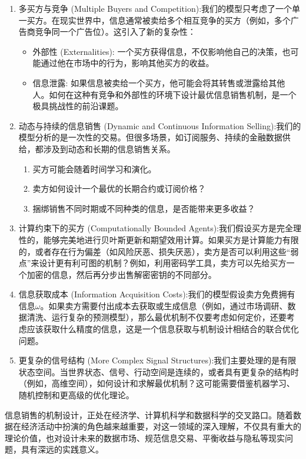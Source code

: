 \begin{enumerate}
    \item 多买方与竞争 (Multiple Buyers and Competition):我们的模型只考虑了一个单一买方。在现实世界中，信息通常被卖给多个相互竞争的买方（例如，多个广告商竞争同一个广告位）。这引入了新的复杂性：
       \begin{itemize}
         \item 外部性 (Externalities): 一个买方获得信息，不仅影响他自己的决策，也可能通过他在市场中的行为，影响其他买方的收益。
         \item 信息泄露: 如果信息被卖给一个买方，他可能会将其转售或泄露给其他人。如何在这种有竞争和外部性的环境下设计最优信息销售机制，是一个极具挑战性的前沿课题。
       \end{itemize}
    \item 动态与持续的信息销售 (Dynamic and Continuous Information Selling):我们的模型分析的是一次性的交易。但很多场景，如订阅服务、持续的金融数据供给，都涉及到动态和长期的信息销售关系。
       \begin{enumerate}
         \item 买方可能会随着时间学习和演化。
         \item 卖方如何设计一个最优的长期合约或订阅价格？
         \item 捆绑销售不同时期或不同种类的信息，是否能带来更多收益？
       \end{enumerate}
    \item 计算约束下的买方 (Computationally Bounded Agents):我们假设买方是完全理性的，能够完美地进行贝叶斯更新和期望效用计算。如果买方是计算能力有限的，或者存在行为偏差（如风险厌恶、损失厌恶），卖方是否可以利用这些“弱点”来设计更有利可图的机制？例如，利用密码学工具，卖方可以先给买方一个加密的信息，然后再分步出售解密密钥的不同部分。
    \item 信息获取成本 (Information Acquisition Costs):我们的模型假设卖方免费拥有信息$\omega$。如果卖方需要付出成本去获取或生成信息（例如，通过市场调研、数据清洗、运行复杂的预测模型），那么最优机制不仅要考虑如何定价，还要考虑应该获取什么精度的信息，这是一个信息获取与机制设计相结合的联合优化问题。
    \item 更复杂的信号结构 (More Complex Signal Structures):我们主要处理的是有限状态空间。当世界状态、信号、行动空间是连续的，或者具有更复杂的结构时（例如，高维空间），如何设计和求解最优机制？这可能需要借鉴机器学习、随机控制和更高级的优化理论。
\end{enumerate}

信息销售的机制设计，正处在经济学、计算机科学和数据科学的交叉路口。随着数据在经济活动中扮演的角色越来越重要，对这一领域的深入理解，不仅具有重大的理论价值，也对设计未来的数据市场、规范信息交易、平衡收益与隐私等现实问题，具有深远的实践意义。